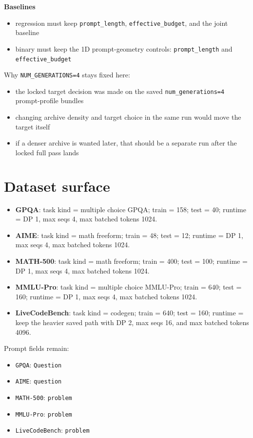 \documentclass[11pt]{article}
\begin{document}
\textbf{Baselines}
\begin{itemize}[leftmargin=1.5em]
\item regression must keep \texttt{prompt\_length}, \texttt{effective\_budget}, and the joint baseline
\item binary must keep the 1D prompt-geometry controls: \texttt{prompt\_length} and \texttt{effective\_budget}
\end{itemize}

Why \texttt{NUM\_GENERATIONS=4} stays fixed here:
\begin{itemize}[leftmargin=1.5em]
\item the locked target decision was made on the saved \texttt{num\_generations=4} prompt-profile bundles
\item changing archive density and target choice in the same run would move the target itself
\item if a denser archive is wanted later, that should be a separate run after the locked full pass lands
\end{itemize}

\section*{Dataset surface}

\small
\begin{itemize}[leftmargin=1.5em]
\item \textbf{GPQA}: task kind = multiple choice GPQA; train = 158; test = 40; runtime = DP 1, max seqs 4, max batched tokens 1024.
\item \textbf{AIME}: task kind = math freeform; train = 48; test = 12; runtime = DP 1, max seqs 4, max batched tokens 1024.
\item \textbf{MATH-500}: task kind = math freeform; train = 400; test = 100; runtime = DP 1, max seqs 4, max batched tokens 1024.
\item \textbf{MMLU-Pro}: task kind = multiple choice MMLU-Pro; train = 640; test = 160; runtime = DP 1, max seqs 4, max batched tokens 1024.
\item \textbf{LiveCodeBench}: task kind = codegen; train = 640; test = 160; runtime = keep the heavier saved path with DP 2, max seqs 16, and max batched tokens 4096.
\end{itemize}
\normalsize

Prompt fields remain:
\begin{itemize}[leftmargin=1.5em]
\item \texttt{GPQA}: \texttt{Question}
\item \texttt{AIME}: \texttt{question}
\item \texttt{MATH-500}: \texttt{problem}
\item \texttt{MMLU-Pro}: \texttt{problem}
\item \texttt{LiveCodeBench}: \texttt{problem}
\end{itemize}
\end{document}
